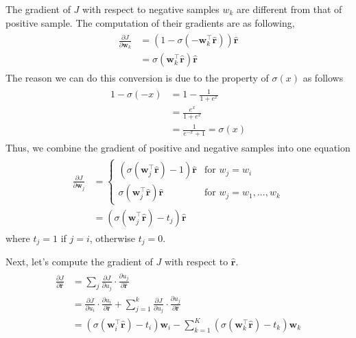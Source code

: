 \documentclass[paper=a4, fontsize=11pt]{scrartcl} %
\numberwithin{equation}{section} %
\numberwithin{figure}{section} %
\numberwithin{table}{section} %
\begin{document}
The gradient of $J$ with respect to negative samples $w_{k}$ are different from that of positive sample. The computation of their gradients are as following,
\begin{align} 
\begin{split}
	\frac{\partial J}{\partial \boldsymbol{w}_{k}} & = \left(1 - \sigma(-\boldsymbol{w}_{k}^{\intercal}\hat{\boldsymbol{r}} ) \right)\hat{\boldsymbol{r}}	 \\
	&= \sigma(\boldsymbol{w}_{k}^{\intercal} \hat{\boldsymbol{r}}) \hat{\boldsymbol{r}}
\end{split}					
\end{align}
The reason we can do this conversion is due to the property of $\sigma(x)$ as follows
\begin{align} 
\begin{split}
	1 - \sigma(-x) &= 1 - \frac{1}{1+e^{x}} \\
	               &= \frac{e^{x}}{1+e^{x}} \\
	               &= \frac{1}{e^{-x}+1} = \sigma(x)
\end{split}					
\end{align}
Thus, we combine the gradient of positive and negative samples into one equation
\begin{align} 
\begin{split}
	\frac{\partial J}{\partial \boldsymbol{w}_{j}} &= 
	\begin{cases}
		(\sigma(\boldsymbol{w}_{j}^{\intercal}\hat{\boldsymbol{r}}) - 1) \hat{\boldsymbol{r}}  &\text{for $w_{j}=w_{i}$}\\
		\sigma(\boldsymbol{w}_{j}^{\intercal}\hat{\boldsymbol{r}}) \hat{\boldsymbol{r}}          &\text{for $w_{j}=w_{1},...,w_{k}$}
	\end{cases} \\
	&= (\sigma(\boldsymbol{w}_{j}^{\intercal}\hat{\boldsymbol{r}}) - t_{j}) \hat{\boldsymbol{r}}
\end{split}					
\end{align}
where $t_{j}=1$ if $j=i$, otherwise $t_{j}=0$.


Next, let's compute the gradient of $J$ with respect to $\hat{\boldsymbol{r}}$.
\begin{align} 
\begin{split}
	\frac{\partial J}{\partial \hat{\boldsymbol{r}}} &= \sum_{j} \frac{\partial J}{\partial u_{j}} \cdot \frac{\partial u_{j}}{\partial \hat{\boldsymbol{r}}} \\
		&= \frac{\partial J}{\partial u_{i}} \cdot \frac{\partial u_{i}}{\partial \hat{\boldsymbol{r}}}  + \sum_{j=1}^{k} \frac{\partial J}{\partial u_{j}} \cdot \frac{\partial u_{j}}{\partial \hat{\boldsymbol{r}}} \\
		&= \left(\sigma(\boldsymbol{w}_{i}^{\intercal}\hat{\boldsymbol{r}}) - t_{i} \right) \boldsymbol{w}_{i} - \sum_{k=1}^{K} \left(\sigma(\boldsymbol{w}_{k}^{\intercal}\hat{\boldsymbol{r}}) - t_{k} \right) \boldsymbol{w}_{k}		
\end{split}					
\end{align}
\end{document}
